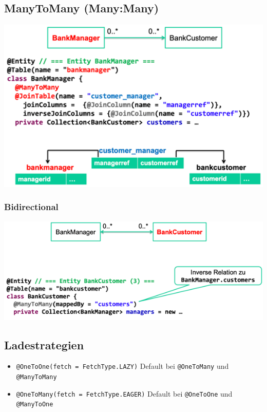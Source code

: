 \documentclass[a4paper, landscape, 8pt]{scrartcl}
\begin{document}
\begin{multicols*}{4}
        \subsection{ManyToMany (Many:Many)}
        \includegraphics[scale=0.25]{graphic/08-many-to-many}
        \subsubsection{Bidirectional}
        \includegraphics[scale=0.25]{graphic/09-bidirectional-many-to-many}
        
        \subsection{Ladestrategien}
        \begin{itemize}
            \item \texttt{@OneToOne(fetch = FetchType.LAZY)}
            \subitem Default bei \texttt{@OneToMany} und \texttt{@ManyToMany}
            \item \texttt{@OneToMany(fetch = FetchType.EAGER)}
            \subitem Default bei \texttt{@OneToOne} und \texttt{@ManyToOne}
        \end{itemize}


\end{multicols*}
\end{document}
